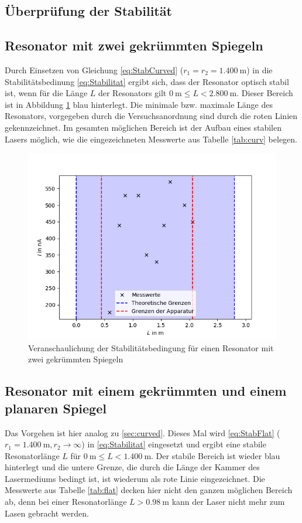 \subsection{Überprüfung der Stabilität}
\subsection{Resonator mit zwei gekrümmten Spiegeln\label{sec:curved}}
Durch Einsetzen von Gleichung \eqref{eq:StabCurved} ($r_1 = r_2 = \SI{1.400}{\metre}$) in die Stabilitätsbedinung \eqref{eq:Stabilitat} ergibt sich, dass der Resonator optisch stabil ist, wenn für die Länge $L$ der Resonators gilt $\SI{0}{\metre}\leq L<\SI{2.800}{\metre}$. Dieser Bereich ist in Abbildung \ref{fig:curved} blau hinterlegt. Die minimale bzw. maximale Länge des Resonators, vorgegeben durch die Versuchsanordnung sind durch die roten Linien gekennzeichnet. Im gesamten möglichen Bereich ist der Aufbau eines stabilen Lasers möglich, wie die eingezeichneten Messwerte aus Tabelle \ref{tab:curv} belegen.


\begin{figure}[h!]
	\centering
	\includegraphics[width=.7\textwidth]{PlotCurved2.png}
	\caption{Veranschaulichung der Stabilitätsbedingung für einen Resonator mit zwei gekrümmten Spiegeln}
	\label{fig:curved}
\end{figure}

\clearpage



\subsection{Resonator mit einem gekrümmten und einem planaren Spiegel}
Das Vorgehen ist hier analog zu \ref{sec:curved}. Dieses Mal wird \eqref{eq:StabFlat} ($r_1 = \SI{1.400}{\metre}, r_2\rightarrow\infty$) in \eqref{eq:Stabilitat} eingesetzt und ergibt eine stabile Resonatorlänge $L$ für $\SI{0}{\metre}\leq L<\SI{1.400}{\metre}$. Der stabile Bereich ist wieder blau hinterlegt und die untere Grenze, die durch die Länge der Kammer des Lasermediums bedingt ist, ist wiederum als rote Linie eingezeichnet. Die Messwerte aus Tabelle \ref{tab:flat} decken hier nicht den ganzen möglichen Bereich ab, denn bei einer Resonatorlänge $L>\SI{0.98}{\metre}$ kann der Laser nicht mehr zum Lasen gebracht werden.


